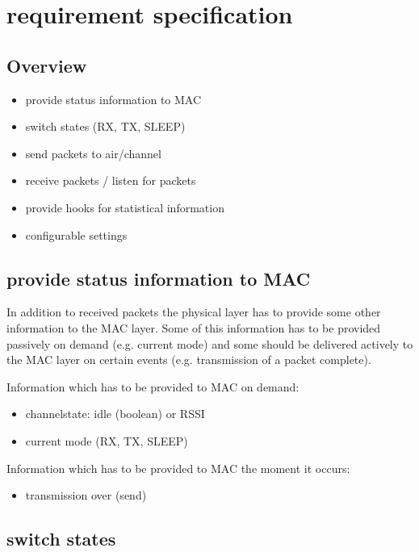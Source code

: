 \section{requirement specification}
\label{req_spec}

\subsection{Overview}
\label{overview}

\begin{itemize}
 \item provide status information to MAC
 \item switch states (RX, TX, SLEEP)
 \item send packets to air/channel
 \item receive packets / listen for packets
 \item provide hooks for statistical information
 \item configurable settings
\end{itemize}

\subsection{provide status information to MAC}
\label{stateInfo}

In addition to received packets the physical layer has to provide some other information to the MAC layer.
Some of this information has to be provided passively on demand (e.g. current mode) and some should be delivered actively to the MAC layer on certain events (e.g. transmission of a packet complete).

\noindent Information which has to be provided to MAC on demand:
\begin{itemize}
 \item channelstate: idle (boolean) or RSSI
 \item current mode (RX, TX, SLEEP)
\end{itemize}

\noindent Information which has to be provided to MAC the moment it occurs:
\begin{itemize}
 \item transmission over (send)
\end{itemize}

\pagebreak
\subsection{switch states}
\label{switchstates}

